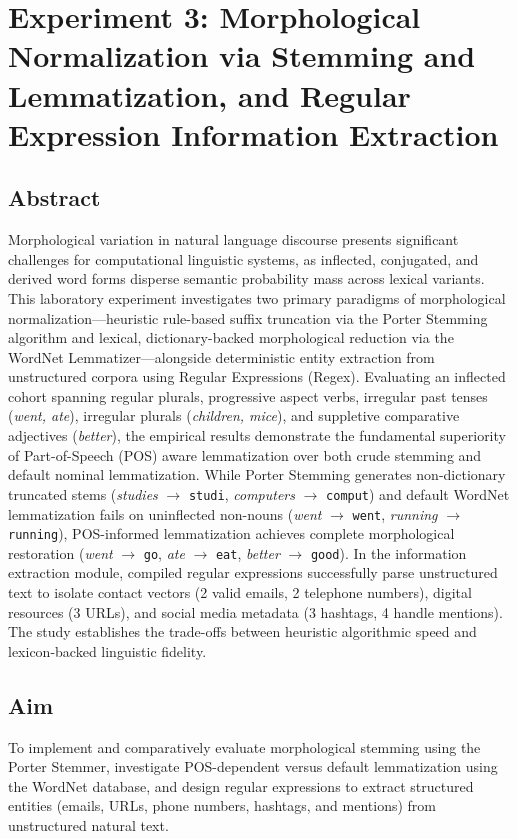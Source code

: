 \chapter{Experiment 3: Morphological Normalization via Stemming and Lemmatization, and Regular Expression Information Extraction}
\label{chap:exp3}

\section{Abstract}
Morphological variation in natural language discourse presents significant challenges for computational linguistic systems, as inflected, conjugated, and derived word forms disperse semantic probability mass across lexical variants. This laboratory experiment investigates two primary paradigms of morphological normalization---heuristic rule-based suffix truncation via the Porter Stemming algorithm and lexical, dictionary-backed morphological reduction via the WordNet Lemmatizer---alongside deterministic entity extraction from unstructured corpora using Regular Expressions (Regex). Evaluating an inflected cohort spanning regular plurals, progressive aspect verbs, irregular past tenses (\textit{went, ate}), irregular plurals (\textit{children, mice}), and suppletive comparative adjectives (\textit{better}), the empirical results demonstrate the fundamental superiority of Part-of-Speech (POS) aware lemmatization over both crude stemming and default nominal lemmatization. While Porter Stemming generates non-dictionary truncated stems (\textit{studies} $\to$ \texttt{studi}, \textit{computers} $\to$ \texttt{comput}) and default WordNet lemmatization fails on uninflected non-nouns (\textit{went} $\to$ \texttt{went}, \textit{running} $\to$ \texttt{running}), POS-informed lemmatization achieves complete morphological restoration (\textit{went} $\to$ \texttt{go}, \textit{ate} $\to$ \texttt{eat}, \textit{better} $\to$ \texttt{good}). In the information extraction module, compiled regular expressions successfully parse unstructured text to isolate contact vectors (2 valid emails, 2 telephone numbers), digital resources (3 URLs), and social media metadata (3 hashtags, 4 handle mentions). The study establishes the trade-offs between heuristic algorithmic speed and lexicon-backed linguistic fidelity.

\section{Aim}
To implement and comparatively evaluate morphological stemming using the Porter Stemmer, investigate POS-dependent versus default lemmatization using the WordNet database, and design regular expressions to extract structured entities (emails, URLs, phone numbers, hashtags, and mentions) from unstructured natural text.

